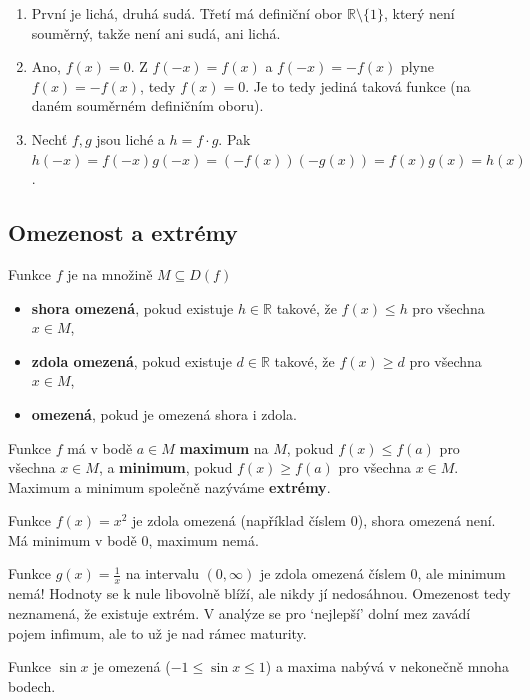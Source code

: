 \begin{solution}
  \begin{enumerate}[label=(\alph*)]
    \item První je lichá, druhá sudá. Třetí má definiční obor $\mathbb{R}\setminus\{1\}$, který není souměrný, takže není ani sudá, ani lichá.
    \item Ano, $f(x) = 0$. Z $f(-x) = f(x)$ a $f(-x) = -f(x)$ plyne $f(x) = -f(x)$, tedy $f(x) = 0$. Je to tedy jediná taková funkce (na daném souměrném definičním oboru).
    \item Nechť $f, g$ jsou liché a $h = f\cdot g$. Pak $h(-x) = f(-x)g(-x) = (-f(x))(-g(x)) = f(x)g(x) = h(x)$.
  \end{enumerate}
\end{solution}

\subsection{Omezenost a extrémy}\label{sec:omezenost-extremy}

\begin{definitionbox}
  Funkce $f$ je na množině $M\subseteq D(f)$
  \begin{itemize}
    \item \textbf{shora omezená}, pokud existuje $h\in\mathbb{R}$ takové, že $f(x)\leq h$ pro všechna $x\in M$,
    \item \textbf{zdola omezená}, pokud existuje $d\in\mathbb{R}$ takové, že $f(x)\geq d$ pro všechna $x\in M$,
    \item \textbf{omezená}, pokud je omezená shora i zdola.
  \end{itemize}
  Funkce $f$ má v bodě $a\in M$ \textbf{maximum} na $M$, pokud $f(x)\leq f(a)$ pro všechna $x\in M$, a \textbf{minimum}, pokud $f(x)\geq f(a)$ pro všechna $x\in M$. Maximum a minimum společně nazýváme \textbf{extrémy}.
\end{definitionbox}

\begin{example}
  Funkce $f(x) = x^2$ je zdola omezená (například číslem $0$), shora omezená není. Má minimum v bodě $0$, maximum nemá.

  Funkce $g(x) = \frac{1}{x}$ na intervalu $(0, \infty)$ je zdola omezená číslem $0$, ale minimum nemá! Hodnoty se k nule libovolně blíží, ale nikdy jí nedosáhnou. Omezenost tedy neznamená, že existuje extrém. V analýze se pro `nejlepší' dolní mez zavádí pojem infimum, ale to už je nad rámec maturity.

  Funkce $\sin x$ je omezená ($-1\leq\sin x\leq 1$) a maxima nabývá v nekonečně mnoha bodech.
\end{example}

